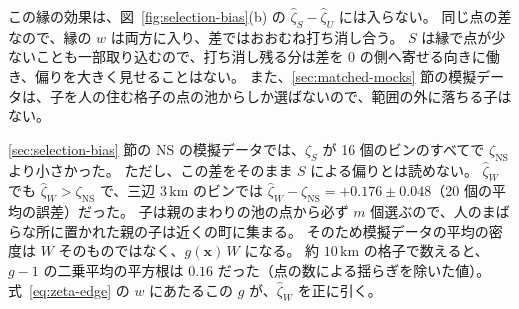 \documentclass[a4paper,11pt]{ltjsarticle}
\begin{document}
\begin{table}[t]
  \centering
  \caption{toy の範囲の縁での $w$ による $\hat\zeta_U - \zeta_{\mathrm{NS}}$。三辺 $r_1$、$r_2$、$r_3$ は km。
    Neyman--Scott の模型（親 $350$ 個相当、子 $5$ 個ずつ、標準偏差 $5\,\mathrm{km}$、約 $330\,\mathrm{km}$ 四方）を 200 回。
    $\mathrm{NS}_{\mathrm{in}}$ は親を範囲の中にだけ撒いたもの、$\mathrm{NS}_{\mathrm{out}}$ は範囲の外 $4\sigma$ まで撒いたもの。
    $\zeta_{\mathrm{NS}}$ は $\mathrm{NS}_{\mathrm{out}}$ の 200 回の平均。右の二列は一回ごとの $\hat\zeta_U - \zeta_{\mathrm{NS}}$ の平均と、平均の誤差。}
  \label{tab:edge}
  \small
  
\end{table}

この縁の効果は、図~\ref{fig:selection-bias}(b) の $\hat\zeta_S - \hat\zeta_U$ には入らない。
同じ点の差なので、縁の $w$ は両方に入り、差ではおおむね打ち消し合う。
$S$ は縁で点が少ないことも一部取り込むので、打ち消し残る分は差を $0$ の側へ寄せる向きに働き、偏りを大きく見せることはない。
また、\ref{sec:matched-mocks} 節の模擬データは、子を人の住む格子の点の池からしか選ばないので、範囲の外に落ちる子はない。

\ref{sec:selection-bias} 節の NS の模擬データでは、$\hat\zeta_S$ が 16 個のビンのすべてで $\zeta_{\mathrm{NS}}$ より小さかった。
ただし、この差をそのまま $S$ による偏りとは読めない。
$\hat\zeta_W$ でも $\hat\zeta_W > \zeta_{\mathrm{NS}}$ で、三辺 $3\,\mathrm{km}$ のビンでは $\hat\zeta_W - \zeta_{\mathrm{NS}} = +0.176 \pm 0.048$（20 個の平均の誤差）だった。
子は親のまわりの池の点から必ず $m$ 個選ぶので、人のまばらな所に置かれた親の子は近くの町に集まる。
そのため模擬データの平均の密度は $W$ そのものではなく、$g(\bm{x})\,W$ になる。
約 $10\,\mathrm{km}$ の格子で数えると、$g - 1$ の二乗平均の平方根は $0.16$ だった（点の数による揺らぎを除いた値）。
式~\eqref{eq:zeta-edge} の $w$ にあたるこの $g$ が、$\hat\zeta_W$ を正に引く。
\end{document}
